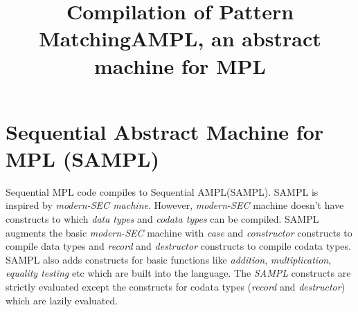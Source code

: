 \documentclass[11pt]{article}
\title{Compilation of Pattern Matching}
\title{AMPL, an abstract machine for MPL}
\newcommand{\<}{\langle}
\renewcommand{\>}{\rangle}
\begin{document}
\maketitle
\section {Sequential Abstract Machine for MPL (SAMPL)}
Sequential MPL code compiles to Sequential AMPL(SAMPL). SAMPL is inspired by {\em modern-SEC machine}. However, {\em modern-SEC} machine doesn't have constructs to which {\em data types} and {\em codata types} can be compiled. SAMPL augments the basic {\em modern-SEC} machine with {\em case} and {\em constructor} constructs to compile data types and  {\em record} and {\em destructor} constructs to compile codata types. SAMPL also adds constructs for basic functions like {\em addition}, {\em multiplication}, {\em equality testing} etc which are built into the language. The {\em SAMPL} constructs are strictly evaluated except the constructs for codata types ({\em record} and {\em destructor}) which are lazily evaluated.
\end{document}

